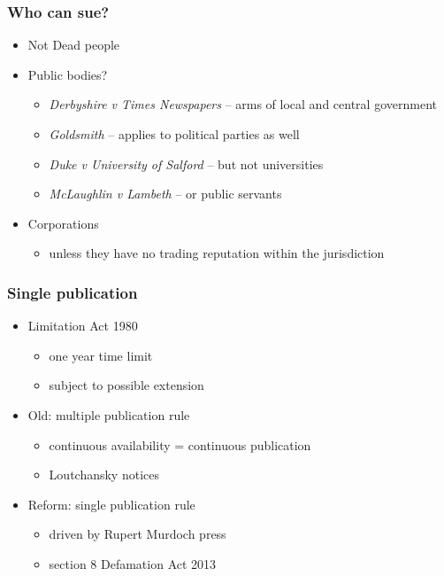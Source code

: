 \documentclass[ignorenonframetext,]{beamer}
\begin{document}
\begin{frame}
\frametitle{Who can sue?}


  \begin{itemize}
  \item Not Dead people
  \item Public bodies?

    \begin{itemize}
    \item {\it Derbyshire v Times Newspapers}{ -- arms of local and central government}
    \item {\it Goldsmith}{ -- applies to political parties as well}
    \item {\it Duke v University of Salford} -- but not universities
    \item {\it McLaughlin v Lambeth} -- or public servants
    \end{itemize}

\item Corporations
  \begin{itemize}
  \item unless they have no trading reputation within the
    jurisdiction
  \end{itemize}
  \end{itemize}

\end{frame}

\begin{frame}
\frametitle{Single publication}

\begin{itemize}
\item  Limitation Act 1980
  \begin{itemize}
  \item  one year time limit
  \item  subject to possible extension
  \end{itemize}
\item  Old: multiple publication rule
  \begin{itemize}
  \item continuous availability = continuous publication
  \item Loutchansky notices
  \end{itemize}
\item  Reform: single publication rule
  \begin{itemize}
  \item driven by Rupert Murdoch press
  \item section 8 Defamation Act 2013
  \end{itemize}
\end{itemize}

\end{frame}
\end{document}
